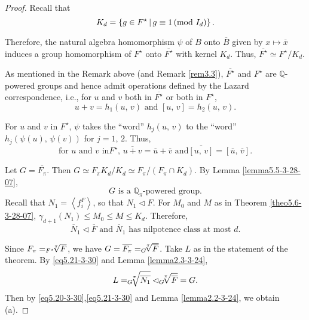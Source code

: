 \documentclass[mathscr]{amsart}
\theoremstyle{theorem}
\theoremstyle{definition}
\numberwithin{equation}{section}
\newcommand{\smod}[1]{\hspace*{-.1cm}\pmod{#1}}
\def \({\left(}
\def \){\right)}
\def\ol{\overline}
\begin{document}
\begin{proof}
Recall that
$$
K_d=\left\{ g\in F^\star\,|\,g\equiv1 \smod {I_d}\right\}.
$$

Therefore, the natural algebra homomorphism $\psi$ of $B$ onto
$\overline B$ given by $x\mapsto \overline x$ induces a group
homomorphism of $F^\star$ onto $\overline{F^\star}$ with kernel
$K_d$.  Thus, $\overline{F^\star}\simeq F^\star/K_d$.

As mentioned in the Remark above (and Remark \ref{rem3.3}),
$\overline{F^\star}$ and $F^\star$ are $\mathbb{Q}$-powered groups
and hence admit operations defined by the Lazard correspondence,
i.e., for $u$ and $v$ both in $\overline {F^\star}$ or both in
$F^\star$,
\begin{equation}\label{eq5.18-3-30}
u+v=h_1\(u,\,v\)\text{ and }[u,\,v]=h_2\(u,\,v\).
\end{equation}

For $u$ and $v$ in $F^\star$, $\psi$ takes the ``word''
$h_j\(u,\,v\)$ to the ``word'' $h_j\(\psi(u),\,\psi(v)\)$ for
$j=1,\,2$.  Thus,
\begin{equation}\label{eq5.19-3-30}
\text{for }u\text{ and }v\text{ in
}F^\star,\,\overline{u+v}=\overline u+\overline v\text{ and
}\overline{[u,\,v]}=[\overline u,\,\overline v].
\end{equation}

Let $G=\overline{F_\pi}$.  Then $G\simeq F_\pi K_d/K_d\simeq
F_\pi/\(F_\pi\cap K_d\)$.  By Lemma \ref{lemma5.5-3-28-07},
\begin{equation}\label{eq5.20-3-30}
G\text{ is a }\mathbb{Q}_\pi\text{-powered group}.
\end{equation}
Recall that $N_1=\left\langle f_i^F\right\rangle$, so that $N_1\lhd
F$.  For $M_0$ and $M$ as in Theorem \ref{theo5.6-3-28-07},
$\gamma_{d+1}\(N_1\)\leq M_0\leq M\leq K_d$.  Therefore,
\begin{equation}\label{eq5.21-3-30}
\overline N_1\lhd \overline F \text{ and }\overline N_1\text{ has
nilpotence class at most }d.
\end{equation}

Since $F_\pi=_{F^\star}\hspace*{-0.2cm}\sqrt[\pi]{F}$, we have
$G=\overline{F_\pi}=_G\hspace*{-0.2cm}\sqrt[\pi]{\ol F}$.  Take $L$
as in the statement of the theorem.  By \eqref{eq5.21-3-30} and
Lemma \ref{lemma2.3-3-24},
$$
L=_G\hspace*{-0.2cm}\sqrt[\pi]{\overline {N_1}} \lhd
_G\hspace*{-0.2cm}\sqrt[\pi]{\overline F}=G.
$$
Then by \eqref{eq5.20-3-30},\eqref{eq5.21-3-30} and Lemma
\ref{lemma2.2-3-24}, we obtain (a).


\end{proof}
\end{document}
